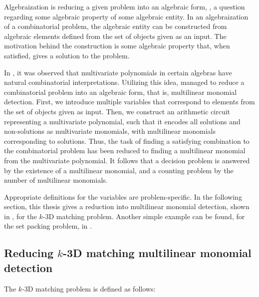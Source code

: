 Algebraization is reducing a given problem into an algebraic form,
, a
question regarding some algebraic property of some algebraic entity. 
In an algebraization of a combinatorial problem, the algebraic entity can be constructed from algebraic elements defined from the 
set of objects given as an input. The motivation behind the construction is some algebraic property that, 
when satisfied, gives a solution to the problem.

In \cite{Valiant92}, it was observed that multivariate polynomials in certain algebras have natural combinatorial interpretations. 
Utilizing this idea, \cite{Koutis05} managed to reduce a combinatorial problem
into an algebraic form, that is, multilinear monomial detection. 
First, we introduce multiple variables that 
correspond to elements from the set of objects given as input. 
Then, we construct an arithmetic circuit representing a multivariate polynomial, such that it 
encodes all solutions and non-solutions as multivariate monomials, 
with multilinear monomials corresponding to solutions. 
Thus, the task of finding a satisfying combination to the combinatorial problem has been reduced to 
finding a multilinear monomial from the multivariate polynomial.
It follows that a decision problem is answered by 
the existence of a multilinear monomial, and a counting problem by the number of multilinear monomials.

Appropriate definitions for the variables are problem-specific. In the following section, this thesis gives a 
reduction into multilinear monomial detection, shown in \cite{KouWil15}, 
for the $k$-3D matching problem. Another simple example can be found, for the set packing problem, in \cite{Koutis05}.


\subsection{Reducing $k$-3D matching
multilinear monomial detection}
\label{sect:reduction_example}

The $k$-3D matching problem is defined as follows:

\begin{problem}
\end{problem}

